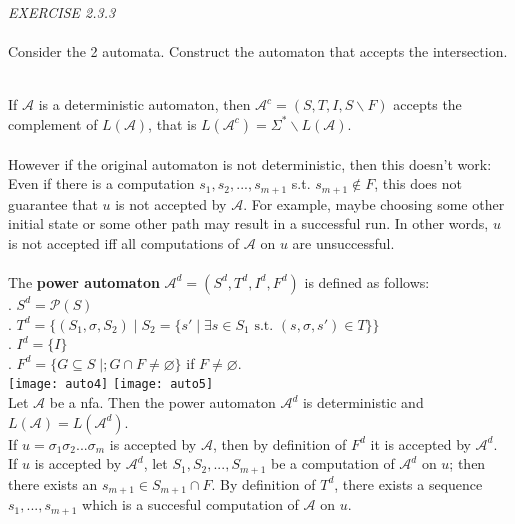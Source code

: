 \documentclass{article}
\begin{document}
\begin{siderules}\color{blue}\textit{EXERCISE 2.3.3}\color{black}\\\\
    \color{blue}Consider the 2 automata. Construct the automaton that accepts the intersection.\\\\\color{black}
\end{siderules}
\color{red}If \(\mathcal{A}\) is a deterministic automaton, then \(\mathcal{A}^{c}=(S,T,I,S\backslash F)\) accepts the complement of \(L(\mathcal{A})\), that is \(L(\mathcal{A}^{c})=\Sigma^{*}\backslash L(\mathcal{A})\).\color{black}\\\\
However if the original automaton is not deterministic, then this doesn't work: Even if there is a computation \(s_{1},s_{2},...,s_{m+1}\) s.t. \(s_{m+1}\notin F\),
this does not guarantee that \(u\) is not accepted by \(\mathcal{A}\). For example, maybe choosing some other initial state or some other path may result in a successful run. 
In other words, \(u\) is not accepted iff all computations of \(\mathcal{A}\) on \(u\) are unsuccessful.\\\\
The \textbf{power automaton} \(\mathcal{A}^{d}=(S^{d},T^{d},I^{d},F^{d})\) is defined as follows:\\
\null{}. \(S^{d}=\mathcal{P}(S)\)\\
\null{}. \(T^{d}=\{(S_{1},\sigma,S_{2})\;|\; S_{2}=\{s'\;|\;\exists s\in S_{1} \text{ s.t. } (s,\sigma,s')\in T\}\}\)\\
\null{}. \(I^{d}=\{I\}\)\\
\null{}. \(F^{d}=\{G\subseteq S\;|; G\cap F\neq\varnothing\}\) if \(F\neq\varnothing\).\\
\texttt{[image: auto4]}
\texttt{[image: auto5]}\\
\color{red}Let \(\mathcal{A}\) be a nfa. Then the power automaton \(\mathcal{A}^{d}\) is deterministic and \(L(\mathcal{A})=L(\mathcal{A}^{d})\).\color{black}\\
If \(u=\sigma_{1}\sigma_{2}...\sigma_{m}\) is accepted by \(\mathcal{A}\), then by definition of \(F^{d}\) it is accepted by \(\mathcal{A}^{d}\).\\
If \(u\) is accepted by \(\mathcal{A}^{d}\), let \(S_{1},S_{2},...,S_{m+1}\) be a computation of \(\mathcal{A}^{d}\) on \(u\); then there exists an \(s_{m+1}\in S_{m+1}\cap F\).
By definition of \(T^{d}\), there exists a sequence \(s_{1},...,s_{m+1}\) which is a succesful computation of \(\mathcal{A}\) on \(u\).\\
\end{document}
